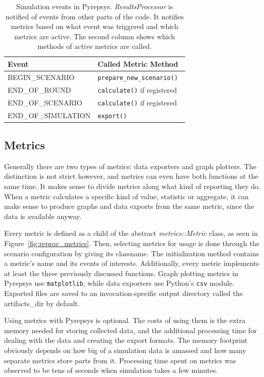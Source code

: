 \documentclass[%
    ]{\PathToTumTemplate/thesis/tum_thesis}
\begin{document}
\begin{table}[tbp]
\centering
\begin{tabular}{ll}
\toprule
\textbf{Event}        & \textbf{Called Metric Method} \\ \midrule
BEGIN\_SCENARIO       & \texttt{prepare\_new\_scenario() } \\
END\_OF\_ROUND        & \texttt{calculate()} if registered \\
END\_OF\_SCENARIO     & \texttt{calculate()} if registered \\
END\_OF\_SIMULATION   &  \texttt{export()} \\
\bottomrule
\end{tabular}
\caption{
	Simulation events in Pyrepsys.
	\emph{ResultsProcessor} is notified of events from other parts of the code.
	It notifies metrics based on what event was triggered and which metrics are active.
	The second column shows which methods of active metrics are called.
}
\label{tab:simulation_events}
\end{table}


\subsection{Metrics}

Generally there are two types of metrics: data exporters and graph plotters.
The distinction is not strict however, and metrics can even have both functions at the same time.
It makes sense to divide metrics along what kind of reporting they do.
When a metric calculates a specific kind of value, statistic or aggregate, it can make sense to produce graphs and data exports from the same metric, since the data is available anyway.

Every metric is defined as a child of the abstract \emph{metrics::Metric} class, as seen in Figure~\ref{fig:reproc_metrics}.
Then, selecting metrics for usage is done through the scenario configuration by giving its classname.
The initialization method contains a metric's name and its events of interests.
Additionally, every metric implements at least the three previously discussed functions.
Graph plotting metrics in Pyrepsys use \texttt{matplotlib}, while data exporters use Python's \texttt{csv} module.
Exported files are saved to an invocation-specific output directory called the \gls{artifacts_dir} by default.

Using metrics with Pyrepsys is optional.
The costs of using them is the extra memory needed for storing collected data, and the additional processing time for dealing with the data and creating the export formats.
The memory footprint obviously depends on how big of a simulation data is amassed and how many separate metrics store parts from it.
Processing time spent on metrics was observed to be tens of seconds when simulation takes a few minutes.
\end{document}
